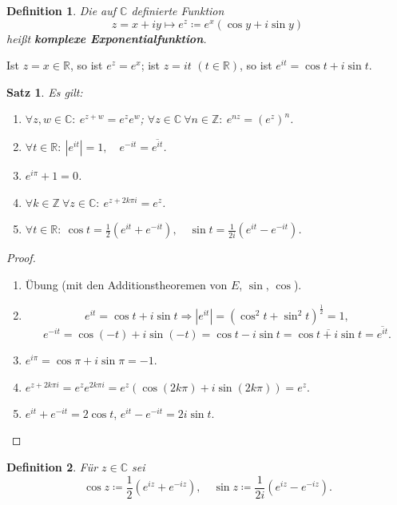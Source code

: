 \documentclass[12pt]{extreport} %
\newcommand{\C}{\mathbb{C}}
\newcommand{\R}{\mathbb{R}}
\newcommand{\Z}{\mathbb{Z}}
\theoremstyle{named}
\theoremstyle{itshape}
\newtheorem{satz}[unnamedtheorem]{Satz}
\newtheorem*{definition}{Definition}
\theoremstyle{normal}
\begin{document}
{\begin{definition}
Die auf $\C$ definierte Funktion $$ z=x+iy \mapsto  e^{z} \coloneqq e^{x} (\cos y + i \sin y) $$ hei{\ss}t \textbf{komplexe Exponentialfunktion}.
\end{definition}

Ist $z = x \in \R$, so ist $e^{z} = e^{x}$; ist $z = it$ $(t \in \R)$, so ist $e^{it} = \cos t + i \sin t$.


\begin{satz} \label{12.1:satz}
	Es gilt: 
	\begin{enumerate}
		\item $\forall z, w \in \C: ~ e^{z +w} = e^{z} e^{w}$; $\forall z \in \C ~ \forall n \in \Z: ~ e^{nz} = (e^{z})^n$. \label{12.1.a:satz}
		\item $\forall t \in \R: ~ |e^{it}| = 1,\quad e^{-it} = \overline{e^{it}}$. \label{12.1.b:satz}
		\item $e^{i \pi} + 1 = 0$. \label{12.1.c:satz}
		\item $\forall k \in \Z ~ \forall z \in \C: ~ e^{z + 2 k \pi i} = e^{z}$. \label{12.1.d:satz}
		\item $\forall t \in \R: ~\cos t = \frac{1}{2} \left( e^{it} + e^{-it} \right), \quad \sin t = \frac{1}{2i} \left( e^{it} - e^{-it} \right)$. \label{12.1.e:satz}
	\end{enumerate}
\end{satz}

\begin{proof} ~\
	\begin{enumerate}
		\item Übung (mit den Additionstheoremen von $E$, $\sin$, $\cos$).
		\item $$e^{it} = \cos t + i \sin t \Rightarrow |e^{it}| = (\cos^{2} t + \sin^{2} t)^{\frac{1}{2}} = 1,$$
		      $$ e^{-it} = \cos (-t) + i \sin (-t) = \cos t - i \sin t = \overline{\cos t + i \sin t} = \overline{e^{it}}. $$
		\item $e^{i\pi} = \cos \pi + i \sin \pi = -1$.
		\item $e^{z+2 k \pi i} = e^z e^{2 k \pi i}= e^z(\cos (2 k \pi) + i \sin (2k \pi)) = e^z.$ 
		\item $e^{it} + e^{-it} = 2 \cos t$, $e^{it} - e^{-it} = 2i \sin t$.
	\end{enumerate}
\end{proof}


\begin{definition}
	Für $z \in \C$ sei
	$$ \cos z \coloneqq \frac{1}{2} \left( e^{iz} + e^{-iz} \right), \quad \sin z \coloneqq \frac{1}{2 i} \left( e^{iz} - e^{-iz} \right). $$
\end{definition}


}
\end{document}
